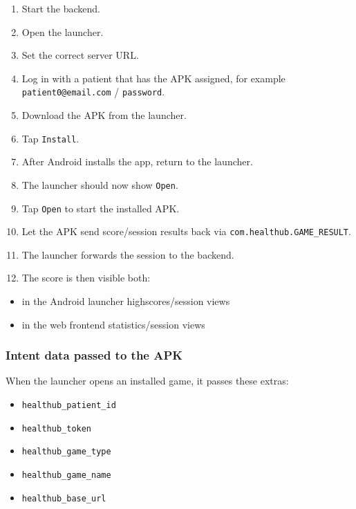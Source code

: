 \begin{enumerate}
\def\labelenumi{\arabic{enumi}.}
\tightlist
\item
  Start the backend.
\item
  Open the launcher.
\item
  Set the correct server URL.
\item
  Log in with a patient that has the APK assigned, for example
  \texttt{patient0@email.com} / \texttt{password}.
\item
  Download the APK from the launcher.
\item
  Tap \texttt{Install}.
\item
  After Android installs the app, return to the launcher.
\item
  The launcher should now show \texttt{Open}.
\item
  Tap \texttt{Open} to start the installed APK.
\item
  Let the APK send score/session results back via
  \texttt{com.healthub.GAME\_RESULT}.
\item
  The launcher forwards the session to the backend.
\item
  The score is then visible both:
\end{enumerate}

\begin{itemize}
\tightlist
\item
  in the Android launcher highscores/session views
\item
  in the web frontend statistics/session views
\end{itemize}

\subsubsection{Intent data passed to the
APK}\label{intent-data-passed-to-the-apk}

When the launcher opens an installed game, it passes these extras:

\begin{itemize}
\tightlist
\item
  \texttt{healthub\_patient\_id}
\item
  \texttt{healthub\_token}
\item
  \texttt{healthub\_game\_type}
\item
  \texttt{healthub\_game\_name}
\item
  \texttt{healthub\_base\_url}
\end{itemize}

